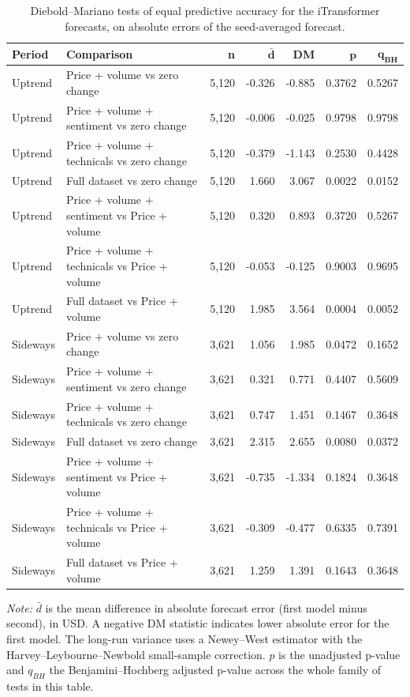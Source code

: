 \begin{table}[H]
\footnotesize
\centering
\begin{threeparttable}
\caption{Diebold--Mariano tests of equal predictive accuracy for the iTransformer forecasts, on absolute errors of the seed-averaged forecast.}
\label{tab:itransformer_dm_oof}
\renewcommand{\arraystretch}{1.1}
\setlength{\tabcolsep}{6pt}
\begin{tabular}{llrrrrr}
\toprule
\textbf{Period} & \textbf{Comparison} & \textbf{n} & $\bm{\bar{d}}$ & \textbf{DM} & $\bm{p}$ & $\bm{q_{BH}}$ \\
\midrule
Uptrend & Price + volume vs zero change & 5,120 & -0.326 & -0.885 & 0.3762 & 0.5267 \\
Uptrend & Price + volume + sentiment vs zero change & 5,120 & -0.006 & -0.025 & 0.9798 & 0.9798 \\
Uptrend & Price + volume + technicals vs zero change & 5,120 & -0.379 & -1.143 & 0.2530 & 0.4428 \\
Uptrend & Full dataset vs zero change & 5,120 & 1.660 & 3.067 & 0.0022 & 0.0152 \\
Uptrend & Price + volume + sentiment vs Price + volume & 5,120 & 0.320 & 0.893 & 0.3720 & 0.5267 \\
Uptrend & Price + volume + technicals vs Price + volume & 5,120 & -0.053 & -0.125 & 0.9003 & 0.9695 \\
Uptrend & Full dataset vs Price + volume & 5,120 & 1.985 & 3.564 & 0.0004 & 0.0052 \\
\midrule
Sideways & Price + volume vs zero change & 3,621 & 1.056 & 1.985 & 0.0472 & 0.1652 \\
Sideways & Price + volume + sentiment vs zero change & 3,621 & 0.321 & 0.771 & 0.4407 & 0.5609 \\
Sideways & Price + volume + technicals vs zero change & 3,621 & 0.747 & 1.451 & 0.1467 & 0.3648 \\
Sideways & Full dataset vs zero change & 3,621 & 2.315 & 2.655 & 0.0080 & 0.0372 \\
Sideways & Price + volume + sentiment vs Price + volume & 3,621 & -0.735 & -1.334 & 0.1824 & 0.3648 \\
Sideways & Price + volume + technicals vs Price + volume & 3,621 & -0.309 & -0.477 & 0.6335 & 0.7391 \\
Sideways & Full dataset vs Price + volume & 3,621 & 1.259 & 1.391 & 0.1643 & 0.3648 \\
\bottomrule
\end{tabular}
\begin{tablenotes}[flushleft]
\footnotesize
\item \textit{Note:} $\bar{d}$ is the mean difference in absolute forecast error (first model minus second), in USD. A negative DM statistic indicates lower absolute error for the first model. The long-run variance uses a Newey--West estimator with the Harvey--Leybourne--Newbold small-sample correction. $p$ is the unadjusted p-value and $q_{BH}$ the Benjamini--Hochberg adjusted p-value across the whole family of tests in this table.
\end{tablenotes}
\end{threeparttable}
\end{table}
